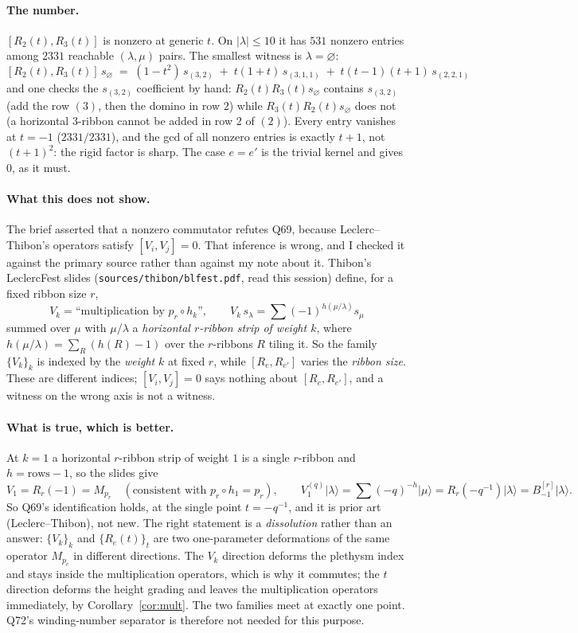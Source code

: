 \documentclass[11pt]{article}
\theoremstyle{definition}
\newcommand{\ket}[1]{\lvert #1\rangle}
\begin{document}
\paragraph{The number.} $[R_2(t),R_3(t)]$ is nonzero at generic $t$. On $|\lambda|\le10$ it has
$531$ nonzero entries among $2331$ reachable $(\lambda,\mu)$ pairs. The smallest witness is
$\lambda=\varnothing$:
\[
[R_2(t),R_3(t)]\,s_\varnothing \;=\; (1-t^2)\,s_{(3,2)} \;+\; t(1+t)\,s_{(3,1,1)}
\;+\; t(t-1)(t+1)\,s_{(2,2,1)}
\]
and one checks the $s_{(3,2)}$ coefficient by hand: $R_2(t)R_3(t)s_\varnothing$ contains
$s_{(3,2)}$ (add the row $(3)$, then the domino in row $2$) while $R_3(t)R_2(t)s_\varnothing$
does not (a horizontal $3$-ribbon cannot be added in row 2 of $(2)$). Every entry vanishes at
$t=-1$ ($2331/2331$), and the gcd of all nonzero entries is exactly $t+1$, not $(t+1)^2$: the
rigid factor is sharp. The case $e=e'$ is the trivial kernel and gives $0$, as it must.

\paragraph{What this does not show.} The brief asserted that a nonzero commutator refutes Q69,
because Leclerc--Thibon's operators satisfy $[V_i,V_j]=0$. That inference is wrong, and I
checked it against the primary source rather than against my note about it. Thibon's
LeclercFest slides (\texttt{sources/thibon/blfest.pdf}, read this session) define, for a fixed
ribbon size $r$,
\[
V_k=\text{``multiplication by } p_r\circ h_k\text{''},\qquad
V_k\,s_\lambda=\sum(-1)^{h(\mu/\lambda)}s_\mu
\]
summed over $\mu$ with $\mu/\lambda$ a \emph{horizontal $r$-ribbon strip of weight $k$}, where
$h(\mu/\lambda)=\sum_R(h(R)-1)$ over the $r$-ribbons $R$ tiling it. So the family
$\{V_k\}_k$ is indexed by the \emph{weight} $k$ at fixed $r$, while $[R_e,R_{e'}]$ varies the
\emph{ribbon size}. These are different indices; $[V_i,V_j]=0$ says nothing about
$[R_e,R_{e'}]$, and a witness on the wrong axis is not a witness.

\paragraph{What is true, which is better.} At $k=1$ a horizontal $r$-ribbon strip of weight $1$
is a single $r$-ribbon and $h=\text{rows}-1$, so the slides give
\[
V_1=R_r(-1)=M_{p_r}\quad(\text{consistent with } p_r\circ h_1=p_r),
\qquad
V_1^{(q)}\ket{\lambda}=\sum(-q)^{-h}\ket{\mu}=R_r(-q^{-1})\ket{\lambda}=B^{[r]}_{-1}\ket{\lambda}.
\]
So Q69's identification holds, at the single point $t=-q^{-1}$, and it is prior art
(Leclerc--Thibon), not new. The right statement is a \emph{dissolution} rather than an answer:
$\{V_k\}_k$ and $\{R_e(t)\}_t$ are two one-parameter deformations of the same operator $M_{p_e}$
in different directions. The $V_k$ direction deforms the plethysm index and stays inside the
multiplication operators, which is why it commutes; the $t$ direction deforms the height
grading and leaves the multiplication operators immediately, by Corollary~\ref{cor:mult}. The
two families meet at exactly one point. Q72's winding-number separator is therefore not needed
for this purpose.
\end{document}
